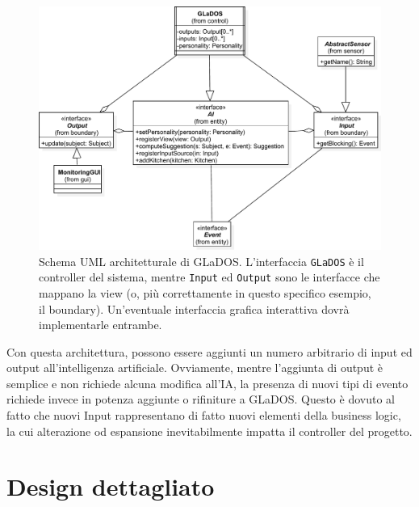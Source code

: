 \documentclass[a4paper,12pt]{report}
\begin{document}
\begin{figure}[h]
	\centering{}
	\includegraphics[width=\textwidth,scale=0.5]{img/arch}
	\caption{Schema UML architetturale di GLaDOS. L'interfaccia \texttt{GLaDOS} è il controller del sistema, mentre \texttt{Input} ed \texttt{Output} sono le interfacce che mappano la view (o, più correttamente in questo specifico esempio, il boundary). Un'eventuale interfaccia grafica interattiva dovrà implementarle entrambe.}
	\label{img:goodarch}
\end{figure}

Con questa architettura, possono essere aggiunti un numero arbitrario di input ed output
all'intelligenza artificiale.
%
Ovviamente, mentre l'aggiunta di output è semplice e non richiede alcuna modifica all'IA, la
presenza di nuovi tipi di evento richiede invece in potenza aggiunte o rifiniture a GLaDOS.
%
Questo è dovuto al fatto che nuovi Input rappresentano di fatto nuovi elementi della business
logic, la cui alterazione od espansione inevitabilmente impatta il controller del progetto.

\section{Design dettagliato}
\end{document}
